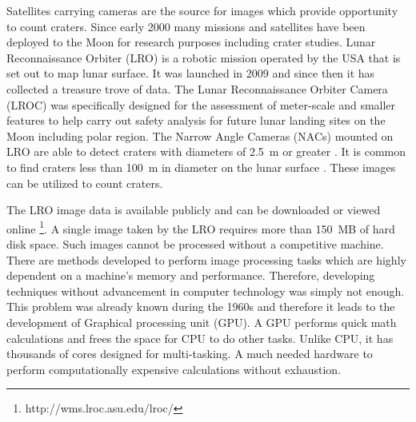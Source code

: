 \documentclass[11pt]{article}
\begin{document}
Satellites carrying cameras are the source for images which provide opportunity to count craters. Since early 2000 many missions and satellites have been deployed to the Moon for research purposes including crater studies. Lunar Reconnaissance Orbiter (LRO) is a robotic mission operated by the USA that is set out to map lunar surface. It was launched in 2009 and since then it has collected a treasure trove of data. The Lunar Reconnaissance Orbiter Camera (LROC) was specifically designed for the assessment of meter-scale and smaller features to help carry out safety analysis for future lunar landing sites on the Moon including polar region. The Narrow Angle Cameras (NACs) mounted on LRO are able to detect craters with diameters of \SI{2.5}{\metre} or greater \cite{robinson2010lunar}. It is common to find craters less than \SI{100}{\metre} in diameter on the lunar surface \cite{robinson2010lunar}. These images can be utilized to count craters.

The LRO image data is available publicly and can be downloaded or viewed online \footnote{http://wms.lroc.asu.edu/lroc/}. A single image taken by the LRO requires more than \SI{150}{MB} of hard disk space. Such images cannot be processed without a competitive machine. There are methods developed to perform image processing tasks which are highly dependent on a machine's memory and performance. Therefore, developing techniques without advancement in computer technology was simply not enough. This problem was already known during the 1960s and therefore it leads to the development of Graphical processing unit (GPU). A GPU performs quick math calculations and frees the space for CPU to do other tasks. Unlike CPU, it has thousands of cores designed for multi-tasking. A much needed hardware to perform computationally expensive calculations without exhaustion. 
\end{document}
